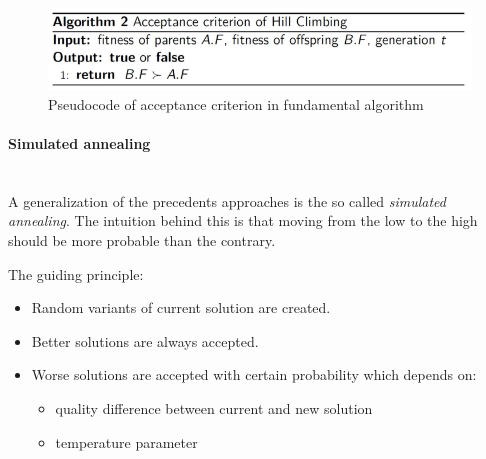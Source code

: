 \documentclass{article}
\begin{document}
\begin{figure}[H]
    \centering
    \includegraphics[scale=0.5]{images/hill_climbing.png}
    \caption{Pseudocode of acceptance criterion in fundamental algorithm}
\end{figure}

\paragraph{Simulated annealing}\mbox{}\\
A generalization of the precedents approaches is the so called \textit{simulated annealing}. The
intuition behind this is that moving from the low to the high should be more probable than the
contrary.

The guiding principle:
\begin{itemize}
    \item Random variants of current solution are created.
    \item Better solutions are always accepted.
    \item Worse solutions are accepted with certain probability which depends on:
          \begin{itemize}
              \item quality difference between current and new solution
              \item temperature parameter
          \end{itemize}
\end{itemize}
\end{document}
